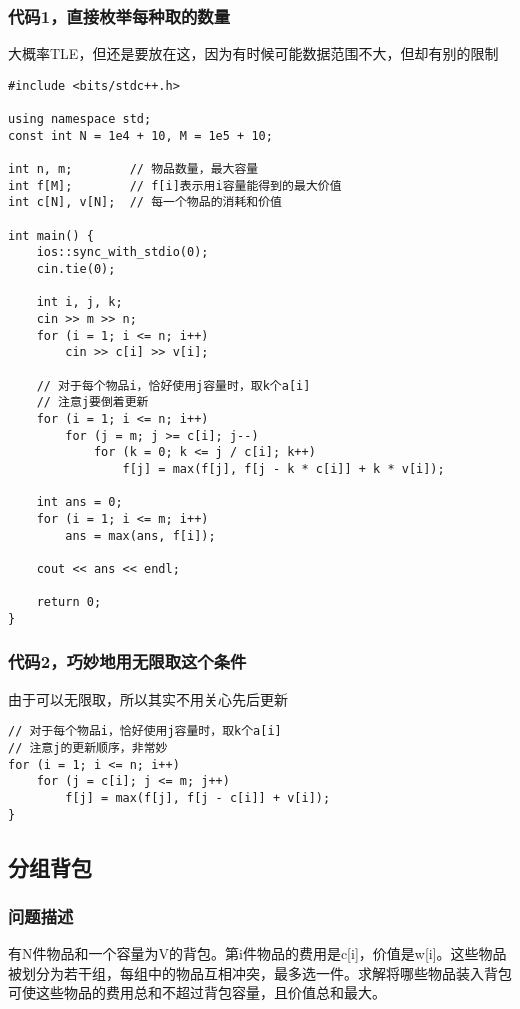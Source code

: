     \subsubsection{代码1，直接枚举每种取的数量}
        大概率TLE，但还是要放在这，因为有时候可能数据范围不大，但却有别的限制
\begin{lstlisting}
#include <bits/stdc++.h>

using namespace std;
const int N = 1e4 + 10, M = 1e5 + 10;

int n, m;        // 物品数量，最大容量
int f[M];        // f[i]表示用i容量能得到的最大价值
int c[N], v[N];  // 每一个物品的消耗和价值

int main() {
    ios::sync_with_stdio(0);
    cin.tie(0);

    int i, j, k;
    cin >> m >> n;
    for (i = 1; i <= n; i++)
        cin >> c[i] >> v[i];

    // 对于每个物品i，恰好使用j容量时，取k个a[i]
    // 注意j要倒着更新
    for (i = 1; i <= n; i++)
        for (j = m; j >= c[i]; j--)
            for (k = 0; k <= j / c[i]; k++)
                f[j] = max(f[j], f[j - k * c[i]] + k * v[i]);

    int ans = 0;
    for (i = 1; i <= m; i++)
        ans = max(ans, f[i]);

    cout << ans << endl;

    return 0;
}
\end{lstlisting}
    \subsubsection{代码2，巧妙地用无限取这个条件}
        由于可以无限取，所以其实不用关心先后更新
\begin{lstlisting}
// 对于每个物品i，恰好使用j容量时，取k个a[i]
// 注意j的更新顺序，非常妙
for (i = 1; i <= n; i++)
    for (j = c[i]; j <= m; j++)
        f[j] = max(f[j], f[j - c[i]] + v[i]);
}
\end{lstlisting}

\subsection{分组背包}
    \subsubsection{问题描述}
        有N件物品和一个容量为V的背包。第i件物品的费用是c[i]，价值是w[i]。这些物品被划分为若干组，每组中的物品互相冲突，最多选一件。求解将哪些物品装入背包可使这些物品的费用总和不超过背包容量，且价值总和最大。
